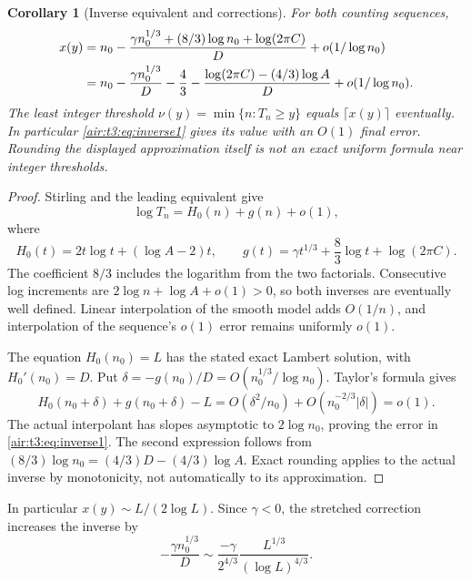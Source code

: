 \documentclass[11pt,letterpaper]{article}
\numberwithin{equation}{section}
\newtheorem{corollary}[theorem]{Corollary}
\theoremstyle{remark}
\begin{document}
\begin{corollary}[Inverse equivalent and corrections]\label{air:t3:cor:inverse}
For both counting sequences,
\begin{align}
x(y)&=n_0-\frac{\gamma n_0^{1/3}+(8/3)\log n_0+\log(2\pi C)}{D}
+o(1/\log n_0)\label{air:t3:eq:inverse1}\\
&=n_0-\frac{\gamma n_0^{1/3}}{D}-\frac43
-\frac{\log(2\pi C)-(4/3)\log A}{D}+o(1/\log n_0).\notag
\end{align}
The least integer threshold $\nu(y)=\min\{n:T_n\ge y\}$ equals $\lceil x(y)\rceil$ eventually. In particular \eqref{air:t3:eq:inverse1} gives its value with an $O(1)$ final error. Rounding the displayed approximation itself is not an exact uniform formula near integer thresholds.
\end{corollary}
\begin{proof}
Stirling and the leading equivalent give
\[
\log T_n=H_0(n)+g(n)+o(1),
\]
where
\[
H_0(t)=2t\log t+(\log A-2)t,\qquad
g(t)=\gamma t^{1/3}+\frac83\log t+\log(2\pi C).
\]
The coefficient $8/3$ includes the logarithm from the two factorials. Consecutive log increments are $2\log n+\log A+o(1)>0$, so both inverses are eventually well defined. Linear interpolation of the smooth model adds $O(1/n)$, and interpolation of the sequence's $o(1)$ error remains uniformly $o(1)$.

The equation $H_0(n_0)=L$ has the stated exact Lambert solution, with $H_0'(n_0)=D$. Put $\delta=-g(n_0)/D=O(n_0^{1/3}/\log n_0)$. Taylor's formula gives
\[
H_0(n_0+\delta)+g(n_0+\delta)-L
=O(\delta^2/n_0)+O(n_0^{-2/3}|\delta|)=o(1).
\]
The actual interpolant has slopes asymptotic to $2\log n_0$, proving the error in \eqref{air:t3:eq:inverse1}. The second expression follows from $(8/3)\log n_0=(4/3)D-(4/3)\log A$. Exact rounding applies to the actual inverse by monotonicity, not automatically to its approximation.
\end{proof}

In particular $x(y)\sim L/(2\log L)$. Since $\gamma<0$, the stretched correction increases the inverse by
\[
-\frac{\gamma n_0^{1/3}}D
\sim\frac{-\gamma}{2^{4/3}}\frac{L^{1/3}}{(\log L)^{4/3}}.
\]
\end{document}
